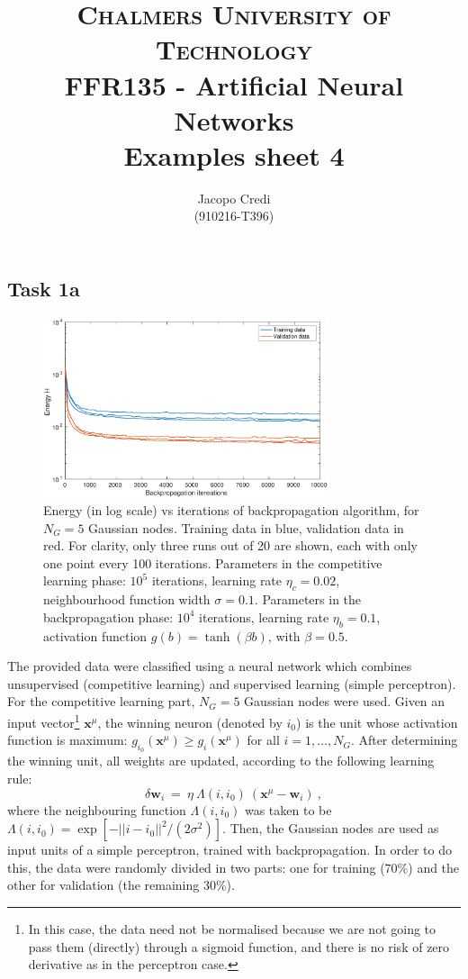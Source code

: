 \documentclass[12pt,titlepage]{article}
\author{Jacopo Credi \\(910216-T396) \\ \vspace*{2cm} }
\title{{\Large \textsc{Chalmers University of Technology}} \\ \bigskip FFR135 - Artificial Neural Networks\\ \bigskip Examples sheet 4 \\ \vspace*{2cm}}
\begin{document}
\parindent=0cm
\maketitle

\subsection*{Task 1a}

\begin{figure}[htbp]
\centering
\includegraphics[width=0.75\textwidth]{1a_energy.pdf}
\caption{Energy (in log scale) vs iterations of backpropagation algorithm, for $N_G = 5$ Gaussian nodes. Training data in blue, validation data in red. For clarity, only three runs out of 20 are shown, each with only one point every 100 iterations. Parameters in the competitive learning phase: $10^5$ iterations, learning rate $\eta_c = 0.02$, neighbourhood function width $\sigma = 0.1$. Parameters in the backpropagation phase: $10^4$ iterations, learning rate $\eta_b = 0.1$, activation function $g(b) = \tanh(\beta b)$, with $\beta = 0.5$.}
\label{1a_energy}
\end{figure}

The provided data were classified using a neural network which combines unsupervised (competitive learning) and supervised learning (simple perceptron).
For the competitive learning part, $N_G = 5$ Gaussian nodes were used. Given an input vector\footnote{In this case, the data need not be normalised because we are not going to pass them (directly) through a sigmoid function, and there is no risk of zero derivative as in the perceptron case.} $\bm{x}^{\mu}$, the winning neuron (denoted by $i_0$) is the unit whose activation function is maximum: $g_{i_0}(\bm{x}^{\mu}) \geq g_{i}(\bm{x}^{\mu})$ for all $i = 1,\ldots,N_G$. After determining the winning unit, all weights are updated, according to the following learning rule:
\[
\delta \bm{w}_i \ = \ \eta \ \Lambda(i,i_0) \ (\bm{x}^{\mu}-\bm{w}_i) \ ,
\]
where the neighbouring function $\Lambda(i,i_0)$ was taken to be $\Lambda(i,i_0) = \exp{[-||i-i_0||^2/(2\sigma^2)]}$. Then, the Gaussian nodes are used as input units of a simple perceptron, trained with backpropagation. In order to do this, the data were randomly divided in two parts: one for training (70\%) and
the other for validation (the remaining 30\%).
\end{document}
